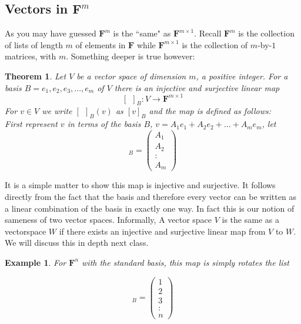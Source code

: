 \documentclass{article}
\theoremstyle{problemstyle}
\newtheorem{theorem}{Theorem}
\newtheorem{example}{Example}
\begin{document}
\subsection*{Vectors in $\textbf{F}^m$}

As you may have guessed $\textbf{F}^m$ is the ``same" as $\textbf{F}^{m \times 1}$. Recall $\textbf{F}^m$ is the collection of lists of length $m$ of elements in $\textbf{F}$ while $\textbf{F}^{m \times 1}$ is the collection of $m$-by-$1$ matrices, with $m$.  Something deeper is true however:

\begin{theorem}
Let $V$ be a vector space of dimension $m$, a positive integer. For a basis $B = e_1,e_2,e_3,...,e_m$ of $V$ there is an injective and surjective linear map $$[ \ \  ]_B:V \rightarrow \textbf{F}^{m \times 1}$$ For $v \in V$ we write $[ \ \ ]_B(v)$ as $[v]_B$ and the map is defined as follows:\\  

First represent $v$ in terms of the basis $B$, $v = A_1e_1 + A_2e_2+...+A_me_m$, let 
\begin{equation}
 [ v ]_B  =
\begin{pmatrix} A_1  \\ A_2 \\ : \\ A_m \end{pmatrix}
\end{equation}
\end{theorem}

It is a simple matter to show this map is injective and surjective. It follows directly from the fact that the basis and therefore every vector can be written as a linear combination of the basis in exactly one way. In fact this is our notion of sameness of two vector spaces. Informally, A vector space $V$ is the same as a vectorspace $W$ if there exists an injective and surjective linear map from $V$ to $W$. We will discuss this in depth next class. 

\begin{example}
For $\textbf{F}^n$ with the standard basis, this map is simply rotates the list  

\begin{equation}
 [(1,2,3,...,n)]_B  =
\begin{pmatrix} 1  \\ 2 \\ 3\\ : \\ n \end{pmatrix}
\end{equation}
\end{example}
\end{document}

